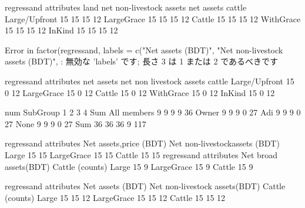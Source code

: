 \begin{Schunk}
\begin{Soutput}
               regressand
attributes      land net non-livestock assets net assets cattle
  Large/Upfront   15                       15         15     12
  LargeGrace      15                       15         15     12
  Cattle          15                       15         15     12
  WithGrace       15                       15         15     12
  InKind          15                       15         15     12
\end{Soutput}
\end{Schunk}
\begin{Schunk}
\begin{Soutput}
Error in factor(regressand, labels = c("Net assets (BDT)", "Net non-livestock assets (BDT)", : 無効な 'labels' です; 長さ 3 は 1 または 2 であるべきです
\end{Soutput}
\begin{Soutput}
               regressand
attributes      net assets net non livestock assets cattle
  Large/Upfront         15                        0     12
  LargeGrace            15                        0     12
  Cattle                15                        0     12
  WithGrace             15                        0     12
  InKind                15                        0     12
\end{Soutput}
\end{Schunk}



\begin{Schunk}
\begin{Soutput}
             num
SubGroup        1   2   3   4 Sum
  All members   9   9   9   9  36
  Owner         9   9   9   0  27
  Adi           9   9   9   0  27
  None          9   9   9   0  27
  Sum          36  36  36   9 117
\end{Soutput}
\end{Schunk}
\begin{Schunk}
\begin{Soutput}
            regressand
attributes   Net assets,\nannual price (BDT) Net non-livestock\n assets (BDT)
  Large                                   15                               15
  LargeGrace                              15                               15
  Cattle                                  15                               15
            regressand
attributes   Net broad assets\n (BDT) Cattle (counts)
  Large                            15               9
  LargeGrace                       15               9
  Cattle                           15               9
\end{Soutput}
\end{Schunk}
\begin{Schunk}
\begin{Soutput}
            regressand
attributes   Net assets (BDT) Net non-livestock assets\n(BDT) Cattle (counts)
  Large                    15                              15              12
  LargeGrace               15                              15              12
  Cattle                   15                              15              12
\end{Soutput}
\end{Schunk}


